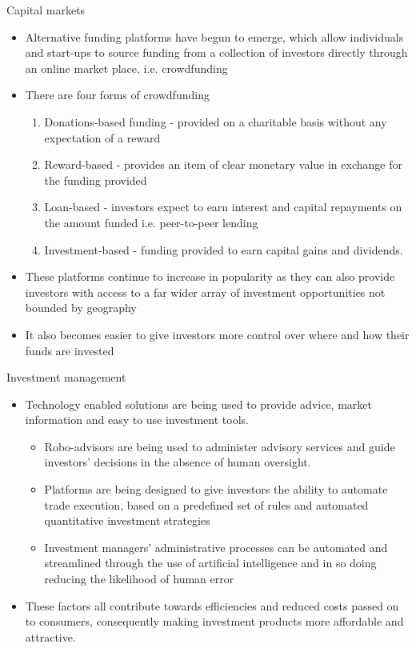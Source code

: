 \documentclass[11pt]{beamer}
\begin{document}
\begin{frame}{Capital markets}
	\begin{itemize}
		\item  Alternative funding platforms have begun to emerge, which allow individuals and start-ups to source funding from a collection of investors directly through an online market place, i.e. crowdfunding
		\item There are four forms of crowdfunding
		\begin{small}
			\begin{enumerate}
				\item Donations-based funding - provided on a charitable basis without any expectation of a reward
				\item Reward-based - provides an item of clear monetary value in exchange for the funding provided
				\item Loan-based - investors expect to earn interest and capital repayments on the amount funded i.e. peer-to-peer lending
				\item Investment-based - funding provided to earn capital gains and dividends.
			\end{enumerate}
		\end{small}
		\item These platforms continue to increase in popularity as they can also provide investors with access to a far wider array of investment opportunities not bounded by geography
		\item It also becomes easier to give investors more control over where and how their funds are invested
	\end{itemize}
\end{frame}


\begin{frame}{Investment management}
	\begin{itemize}
		\item Technology enabled solutions are being used to provide advice, market information and easy to use investment tools.
		\begin{itemize}
			\item Robo-advisors are being used to administer advisory services and guide investors' decisions in the absence of human oversight.
			\item Platforms are being designed to give investors the ability to automate trade execution, based on a predefined set of rules and automated quantitative investment strategies
			\item Investment managers' administrative processes can be automated and streamlined through the use of artificial intelligence and in so doing reducing the likelihood of human error
		\end{itemize}
		\item These factors all contribute towards efficiencies and reduced costs passed on to consumers, consequently making investment products more affordable and attractive.
	\end{itemize}
\end{frame}
\end{document}
